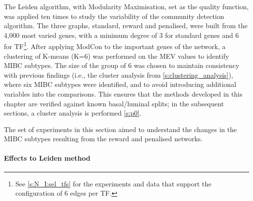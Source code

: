 The Leiden algorithm, with Modularity Maximisation, set as the quality function, was applied ten times to study the variability of the community detection algorithm. The three graphs, standard, reward and penalised, were built from the 4,000 most varied genes, with a minimum degree of 3 for standard genes and 6 for TF\footnote{See \cref{s:N_I:sel_tfs} for the experiments and data that support the configuration of 6 edges per TF.}. After applying ModCon to the important genes of the network, a clustering of K-means (K=6) was performed on the MEV values to identify MIBC subtypes. The size of the group of 6 was chosen to maintain consistency with previous findings (i.e., the cluster analysis from \cref{s:clustering_analysis}), where six MIBC subtypes were identified, and to avoid introducing additional variables into the comparisons. This ensures that the methods developed in this chapter are verified against known basal/luminal splits; in the subsequent sections, a cluster analysis is performed \cref{s:p0}. 

The set of experiments in this section aimed to understand the changes in the MIBC subtypes resulting from the reward and penalised networks.

\paragraph*{Effects to Leiden method}


